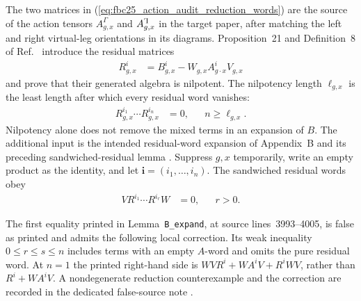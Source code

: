 \documentclass{article}
\begin{document}
The two matrices in
(\ref{eq:fbc25_action_audit_reduction_words}) are the source of the action
tensors $A^{\Gamma}_{g,x}$ and
$A^{\text{\reflectbox{$\Gamma$}}}_{g,x}$ in the target paper, after matching
the left and right virtual-leg orientations in its diagrams.  Proposition~21
and Definition~8 of Ref.~\cite[source lines~3142--3152, with proof at
lines~3943--3986]{Molnar2018SemiInjective} introduce the residual matrices
\begin{align}
    R_{g,x}^{i}
        &=B_{g,x}^{i}
          -W_{g,x}A_{g\mathbin{\cdot}x}^{i}V_{g,x}
    \label{eq:fbc25_action_audit_residual_definition}
\end{align}
and prove that their generated algebra is nilpotent.  The nilpotency length
$\ell_{g,x}$ is the least length after which every residual word vanishes:
\begin{align}
    R_{g,x}^{i_1}\cdots R_{g,x}^{i_n}
        &=0,
        &&n\geq \ell_{g,x}.
    \label{eq:fbc25_action_audit_residual_nilpotency}
\end{align}
Nilpotency alone does not remove the mixed terms in an expansion of $B$.
The additional input is the intended residual-word expansion of Appendix~B
and its preceding sandwiched-residual lemma
\cite[source lines~3946--3970 and 3993--4005]{Molnar2018SemiInjective}.
Suppress $g,x$ temporarily, write an empty product as the identity, and let
$\mathbf i=(i_1,\ldots,i_n)$.  The sandwiched residual words obey
\begin{align}
    V R^{i_1}\cdots R^{i_r}W
        &=0,
        &&r>0.
    \label{eq:fbc25_action_audit_sandwiched_residual_vanishes}
\end{align}

The first equality printed in Lemma~\texttt{B\_expand}, at source
lines~3993--4005, is false as printed and admits the following local
correction.  Its weak inequality
$0\leq r\leq s\leq n$ includes terms with an empty $A$-word and omits the
pure residual word.  At $n=1$ the printed right-hand side is
$WVR^i+WA^iV+R^iWV$, rather than $R^i+WA^iV$.  A nondegenerate reduction
counterexample and the correction are recorded in the dedicated false-source
note \cite{gap:mgsc18_residual_expansion_empty_word_error}.
\end{document}
